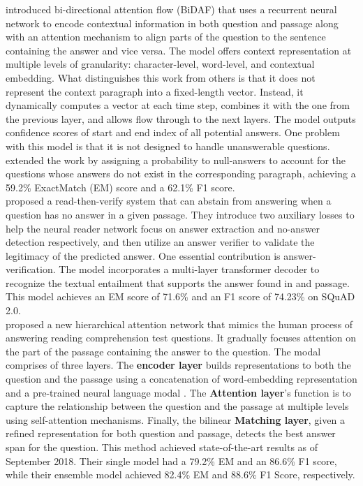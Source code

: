 \citet{DBLP:journals/corr/SeoKFH16} introduced bi-directional attention flow (BiDAF) that uses a recurrent neural network to encode contextual information in both question and passage along with an attention mechanism to align parts of the question to the sentence containing the answer and vice versa. The model offers context representation at multiple levels of granularity: character-level, word-level, and contextual embedding. What distinguishes this work from others is that it does not represent the context paragraph into a fixed-length vector. Instead, it dynamically computes a vector at each time step, combines it with the one from the previous layer, and allows flow through to the next layers. The model outputs confidence scores of start and end index of all potential answers. One problem with this model is that it is not designed to handle unanswerable questions. \citet{DBLP:journals/corr/LevySCZ17} extended the work by assigning a probability to null-answers to account for the questions whose answers do not exist in the corresponding paragraph, achieving a 59.2\% ExactMatch (EM) score and a 62.1\% F1 score.\\

\citet{DBLP:journals/corr/abs-1808-05759} proposed a read-then-verify system that can abstain from answering when a question has no answer in a given passage. They introduce two auxiliary losses to help the neural reader network focus on answer extraction and no-answer detection respectively, and then utilize an answer verifier to validate the legitimacy of the predicted answer. One essential contribution is answer-verification. The model incorporates a multi-layer transformer decoder to recognize the textual entailment that supports the answer found in and passage. This model achieves an EM score of 71.6\% and an F1 score of 74.23\% on SQuAD 2.0. \\

\citet{DBLP:journals/corr/abs-1811-11934} proposed a new hierarchical attention network that mimics the human process of answering reading comprehension test questions. It gradually focuses attention on the part of the passage containing the answer to the question. The modal comprises of three layers. The \textbf{encoder layer} builds representations to both the question and the passage using a concatenation of word-embedding representation \citep{pennington2014glove} and a pre-trained neural language modal \citep{Peters:2018}. The \textbf{Attention layer}'s function is to capture the relationship between the question and the passage at multiple levels using self-attention mechanisms. Finally, the bilinear \textbf{Matching layer}, given a refined representation for both question and passage, detects the best answer span for the question. This method achieved state-of-the-art results as of September 2018. Their single model had a 79.2\% EM and an 86.6\% F1 score, while their ensemble model achieved 82.4\% EM and 88.6\% F1 Score, respectively. \\

